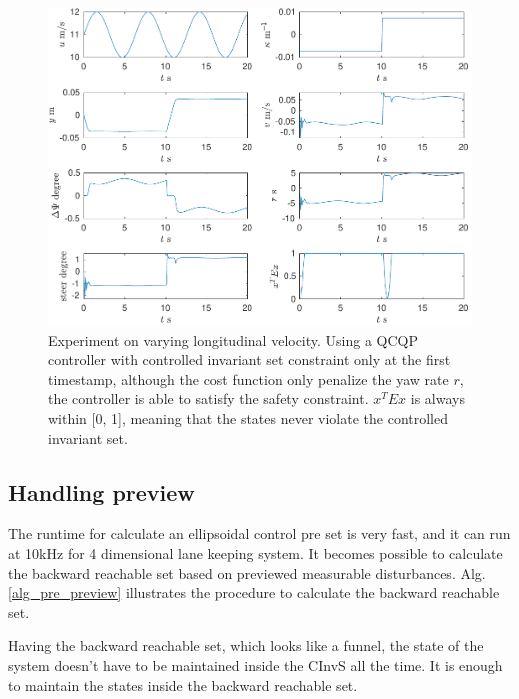\documentclass{article}
\begin{document}
\begin{figure}[H]
	\centering
	\includegraphics[width=0.8\linewidth]{lk_vband/step_response.pdf}
	\caption{Experiment on varying longitudinal velocity. Using a QCQP controller with controlled invariant set constraint only at the first timestamp, although the cost function only penalize the yaw rate $r$, the controller is able to satisfy the safety constraint. $x^T E x$ is always within [0, 1], meaning that the states never violate the controlled invariant set.}
	\label{lk_vband_step_response}
\end{figure}


\subsection{Handling preview}
The runtime for calculate an ellipsoidal control pre set is very fast, and it can run at 10kHz for 4 dimensional lane keeping system. It becomes possible to calculate the backward reachable set based on previewed measurable disturbances. Alg. \ref{alg_pre_preview} illustrates the procedure to calculate the backward reachable set.

Having the backward reachable set, which looks like a funnel, the state of the system doesn't have to be maintained inside the CInvS all the time. It is enough to maintain the states inside the backward reachable set.
\end{document}
